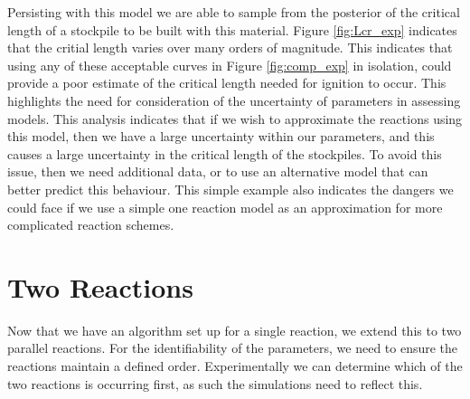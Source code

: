 Persisting with this model we are able to sample from the posterior of the critical length of a stockpile to be built with this material. Figure \ref{fig:Lcr_exp} indicates that the critial length varies over many orders of magnitude. This indicates that using any of these acceptable curves in Figure \ref{fig:comp_exp} in isolation, could provide a poor estimate of the critical length needed for ignition to occur. This highlights the need for consideration of the uncertainty of parameters in assessing models. This analysis indicates that if we wish to approximate the reactions using this model, then we have a large uncertainty within our parameters, and this causes a large uncertainty in the critical length of the stockpiles. To avoid this issue, then we need additional data, or to use an alternative model that can better predict this behaviour. This simple example also indicates the dangers we could face if we use a simple one reaction model as an approximation for more complicated reaction schemes.\\



\section{Two Reactions}
Now that we have an algorithm set up for a single reaction, we extend this to two parallel reactions. For the identifiability of the parameters, we need to ensure the reactions maintain a defined order. Experimentally we can determine which of the two reactions is occurring first, as such the simulations need to reflect this.\\ 

